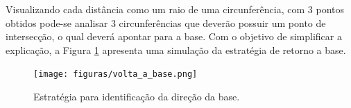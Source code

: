 	 	Visualizando cada distância como um raio de uma circunferência, com 3 pontos obtidos pode-se analisar 3 circunferências que deverão possuir um ponto de intersecção, o qual deverá apontar para a base. Com o objetivo de simplificar a explicação, a Figura \ref{img:back} apresenta uma simulação da estratégia de retorno a base.

	 	\begin{figure}[H]
			\centering
			\texttt{[image: figuras/volta\_a\_base.png]}
			\caption{Estratégia para identificação da direção da base.}
			\label{img:back}
		\end{figure}
